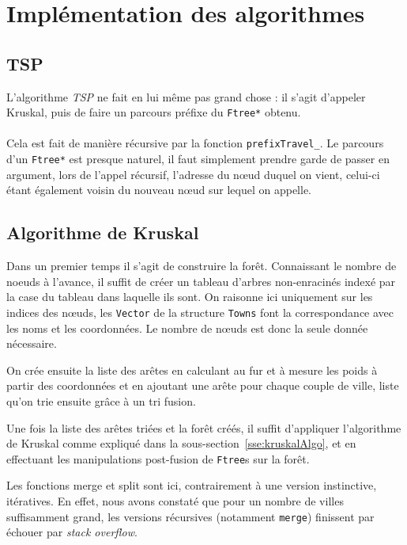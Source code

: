\documentclass[a4paper]{article}
\begin{document}
\section{Implémentation des algorithmes}

\subsection{TSP}
L'algorithme \emph{TSP} ne fait en lui même pas grand chose : il s'agit d'appeler {\sc Kruskal}, puis de faire un parcours préfixe du \texttt{Ftree*} obtenu.

\paragraph*{}
Cela est fait de manière récursive par la fonction \texttt{prefixTravel\_}. Le parcours d'un \texttt{Ftree*} est presque naturel, il faut simplement prendre garde de passer en argument, lors de l'appel récursif, l'adresse du nœud duquel on vient, celui-ci étant également voisin du nouveau nœud sur lequel on appelle.

\subsection{Algorithme de {\sc Kruskal}}

Dans un premier temps il s'agit de construire la forêt. Connaissant le nombre de noeuds à l'avance, il suffit de créer un tableau d'arbres non-enracinés indexé par la case du tableau dans laquelle ils sont. On raisonne ici uniquement sur les indices des nœuds, les \texttt{Vector} de la structure \texttt{Towns} font la correspondance avec les noms et les coordonnées. Le nombre de nœuds est donc la seule donnée nécessaire.

On crée ensuite la liste des arêtes en calculant au fur et à mesure les poids à partir des coordonnées et en ajoutant une arête pour chaque couple de ville, liste qu'on trie ensuite grâce à un tri fusion.

Une fois la liste des arêtes triées et la forêt créés, il suffit d'appliquer l'algorithme de {\sc Kruskal} comme expliqué dans la sous-section~\ref{sse:kruskalAlgo}, et en effectuant les manipulations post-fusion de \texttt{Ftree}s sur la forêt.

Les fonctions merge et split sont ici, contrairement à une version instinctive, itératives. En effet, nous avons constaté que pour un nombre de villes suffisamment grand, les versions récursives (notamment \texttt{merge}) finissent par échouer par \textit{stack overflow}.
\end{document}
